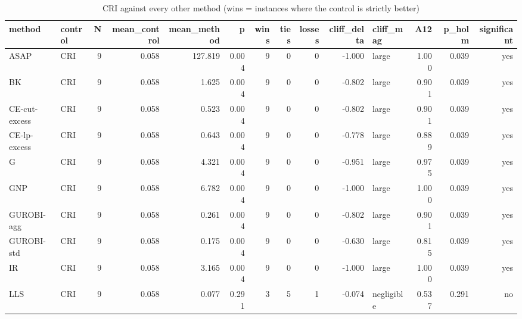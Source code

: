 \begin{table}[htbp]
\centering
\small
\caption{CRI against every other method (wins = instances where the control is strictly better)}
\label{tab:E6_scalability_b120_vs_CRI}
\begin{tabular}{llrrrrrrrrlrrr}
\toprule
method & control & N & mean\_control & mean\_method & p & wins & ties & losses & cliff\_delta & cliff\_mag & A12 & p\_holm & significant \\
\midrule
ASAP & CRI & 9 & 0.058 & 127.819 & 0.004 & 9 & 0 & 0 & -1.000 & large & 1.000 & 0.039 & yes \\
BK & CRI & 9 & 0.058 & 1.625 & 0.004 & 9 & 0 & 0 & -0.802 & large & 0.901 & 0.039 & yes \\
CE-cut-excess & CRI & 9 & 0.058 & 0.523 & 0.004 & 9 & 0 & 0 & -0.802 & large & 0.901 & 0.039 & yes \\
CE-lp-excess & CRI & 9 & 0.058 & 0.643 & 0.004 & 9 & 0 & 0 & -0.778 & large & 0.889 & 0.039 & yes \\
G & CRI & 9 & 0.058 & 4.321 & 0.004 & 9 & 0 & 0 & -0.951 & large & 0.975 & 0.039 & yes \\
GNP & CRI & 9 & 0.058 & 6.782 & 0.004 & 9 & 0 & 0 & -1.000 & large & 1.000 & 0.039 & yes \\
GUROBI-agg & CRI & 9 & 0.058 & 0.261 & 0.004 & 9 & 0 & 0 & -0.802 & large & 0.901 & 0.039 & yes \\
GUROBI-std & CRI & 9 & 0.058 & 0.175 & 0.004 & 9 & 0 & 0 & -0.630 & large & 0.815 & 0.039 & yes \\
IR & CRI & 9 & 0.058 & 3.165 & 0.004 & 9 & 0 & 0 & -1.000 & large & 1.000 & 0.039 & yes \\
LLS & CRI & 9 & 0.058 & 0.077 & 0.291 & 3 & 5 & 1 & -0.074 & negligible & 0.537 & 0.291 & no \\
\bottomrule
\end{tabular}
\end{table}

